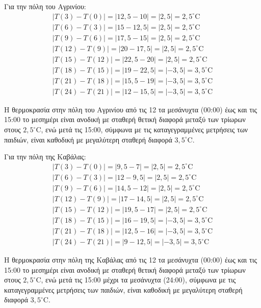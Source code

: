 
\begin{alist}
\item Για την πόλη του Αγρινίου:
\begin{gather*}
|T(3) - T(0)| = |12,5 - 10| = |2,5| = 2,5^\circ\text{C} \\
|T(6) - T(3)| = |15 - 12,5| = |2,5| = 2,5^\circ\text{C} \\
|T(9) - T(6)| = |17,5 - 15| = |2,5| = 2,5^\circ\text{C} \\
|T(12) - T(9)| = |20 - 17,5| = |2,5| = 2,5^\circ\text{C} \\
|T(15) - T(12)| = |22,5 - 20| = |2,5| = 2,5^\circ\text{C} \\
|T(18) - T(15)| = |19 - 22,5| = |-3,5| = 3,5^\circ\text{C} \\
|T(21) - T(18)| = |15,5 - 19| = |-3,5| = 3,5^\circ\text{C} \\
|T(24) - T(21)| = |12 - 15,5| = |-3,5| = 3,5^\circ\text{C}
\end{gather*}

Η θερμοκρασία στην πόλη του Αγρινίου από τις 12 τα μεσάνυχτα (00:00) έως και τις 15:00 το μεσημέρι είναι ανοδική με σταθερή θετική διαφορά μεταξύ των τρίωρων στους $2,5^\circ\text{C}$, ενώ μετά τις 15:00, σύμφωνα με τις καταγεγραμμένες μετρήσεις των παιδιών, είναι καθοδική με μεγαλύτερη σταθερή διαφορά $3,5^\circ\text{C}$.

Για την πόλη της Καβάλας:
\begin{gather*}
|T(3) - T(0)| = |9,5 - 7| = |2,5| = 2,5^\circ\text{C} \\
|T(6) - T(3)| = |12 - 9,5| = |2,5| = 2,5^\circ\text{C} \\
|T(9) - T(6)| = |14,5 - 12| = |2,5| = 2,5^\circ\text{C} \\
|T(12) - T(9)| = |17 - 14,5| = |2,5| = 2,5^\circ\text{C} \\
|T(15) - T(12)| = |19,5 - 17| = |2,5| = 2,5^\circ\text{C} \\
|T(18) - T(15)| = |16 - 19,5| = |-3,5| = 3,5^\circ\text{C} \\
|T(21) - T(18)| = |12,5 - 16| = |-3,5| = 3,5^\circ\text{C} \\
|T(24) - T(21)| = |9 - 12,5| = |-3,5| = 3,5^\circ\text{C}
\end{gather*}

Η θερμοκρασία στην πόλη της Καβάλας από τις 12 τα μεσάνυχτα (00:00) έως και τις 15:00 το μεσημέρι είναι ανοδική με σταθερή θετική διαφορά μεταξύ των τρίωρων στους $2,5^\circ\text{C}$, ενώ μετά τις 15:00 μέχρι τα μεσάνυχτα (24:00), σύμφωνα με τις καταγεγραμμένες μετρήσεις των παιδιών, είναι καθοδική με μεγαλύτερη σταθερή διαφορά $3,5^\circ\text{C}$.


\end{alist}
